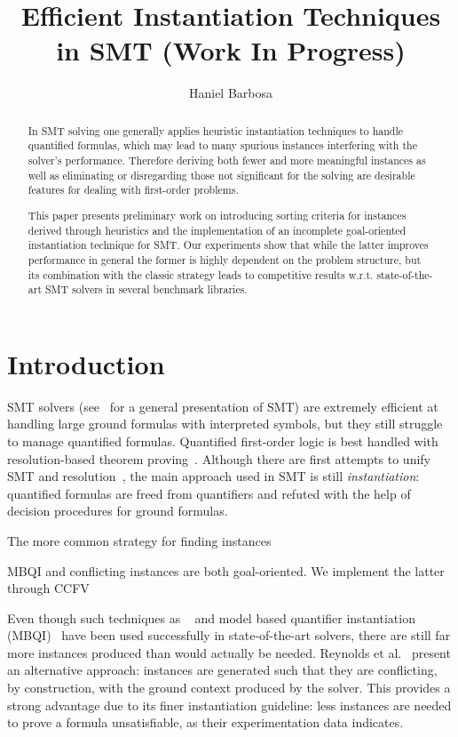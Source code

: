 \message{ !name(main.tex)}\documentclass{easychair}
\title{Efficient Instantiation Techniques in SMT (Work In Progress)}
\author{Haniel Barbosa}
\institute{LORIA, INRIA, Universit\'{e} de Lorraine, Nancy, France
  \\ \email{Haniel.Barbosa@inria.fr}
}
\begin{document}


\maketitle

\begin{abstract}
In SMT solving one generally applies heuristic instantiation
techniques to handle quantified formulas, which may lead to many
spurious instances interfering with the solver's performance.
Therefore deriving both fewer and more meaningful instances as well
as eliminating or disregarding those not significant for the solving
are desirable features for dealing with first-order problems.

This paper presents preliminary work on introducing sorting criteria
for instances derived through heuristics and the implementation of an
incomplete goal-oriented instantiation technique for SMT. Our
experiments show that while the latter improves performance in general
the former is highly dependent on the problem structure, but its
combination with the classic strategy leads to competitive results
w.r.t. state-of-the-art SMT solvers in several benchmark libraries.
\end{abstract}

\section{Introduction}
\label{sec:intro}

SMT solvers (see~\cite{Barret2009} for a general presentation of SMT)
are extremely efficient at handling large ground formulas with
interpreted symbols, but they still struggle to manage quantified
formulas.  Quantified first-order logic is best handled with
resolution-based theorem
proving~\cite{Bachmair1994,Nieuwenhuis2001-har}. Although there are
first attempts to unify SMT and resolution~\cite{deMoura2008}, the
main approach used in SMT is still \emph{instantiation}: quantified
formulas are freed from quantifiers and refuted with the help of
decision procedures for ground formulas.

The more common strategy for finding instances


MBQI and conflicting instances are both goal-oriented. We implement
the latter through CCFV

Even though such techniques as
{\ematch}~\cite{Detlefs2005} and model based quantifier instantiation
(MBQI)~\cite{Ge2009} have been used successfully in state-of-the-art
solvers, there are still far more instances produced than would actually be
needed.  Reynolds et al.~\cite{Reynolds2014} present an alternative
approach: instances are generated such that they are conflicting, by
construction, with the ground context produced by the solver.  This provides a
strong advantage due to its finer instantiation guideline: less instances
are needed to prove a formula unsatisfiable, as their experimentation data
indicates.
\end{document}
